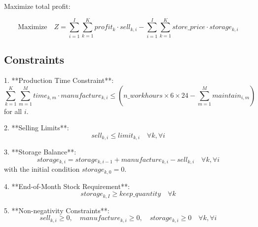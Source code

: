 \documentclass{article}
\begin{document}
Maximize total profit:

\[
\text{Maximize} \quad Z = \sum_{i=1}^{I} \sum_{k=1}^{K} profit_k \cdot sell_{k, i} - \sum_{i=1}^{I} \sum_{k=1}^{K} store\_price \cdot storage_{k, i}
\]

\subsection*{Constraints}

1. **Production Time Constraint**:
   \[
   \sum_{k=1}^{K} \sum_{m=1}^{M} time_{k, m} \cdot manufacture_{k, i} \leq (n\_workhours \times 6 \times 24 - \sum_{m=1}^{M} maintain_{i, m})
   \]
   for all $i$.

2. **Selling Limits**:
   \[
   sell_{k, i} \leq limit_{k, i} \quad \forall k, \forall i
   \]

3. **Storage Balance**:
   \[
   storage_{k, i} = storage_{k, i-1} + manufacture_{k, i} - sell_{k, i} \quad \forall k, \forall i
   \]
   with the initial condition \(storage_{k, 0} = 0\).

4. **End-of-Month Stock Requirement**:
   \[
   storage_{k, I} \geq keep\_quantity \quad \forall k
   \]

5. **Non-negativity Constraints**:
   \[
   sell_{k, i} \geq 0, \quad manufacture_{k, i} \geq 0, \quad storage_{k, i} \geq 0 \quad \forall k, \forall i
   \]
\end{document}
